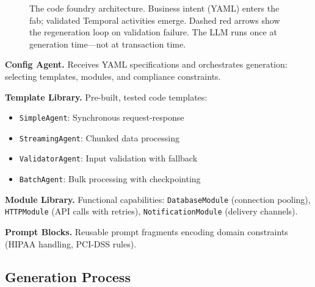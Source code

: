 \documentclass[11pt]{article}
\begin{document}
\begin{figure}[ht]
{
}%
\caption{The code foundry architecture. Business intent (YAML) enters the fab; validated Temporal activities emerge. Dashed red arrows show the regeneration loop on validation failure. The LLM runs once at generation time---not at transaction time.}
\label{fig:architecture}
\end{figure}

\textbf{Config Agent.} Receives YAML specifications and orchestrates generation: selecting templates, modules, and compliance constraints.

\textbf{Template Library.} Pre-built, tested code templates:
\begin{itemize}
    \item \texttt{SimpleAgent}: Synchronous request-response
    \item \texttt{StreamingAgent}: Chunked data processing
    \item \texttt{ValidatorAgent}: Input validation with fallback
    \item \texttt{BatchAgent}: Bulk processing with checkpointing
\end{itemize}

\textbf{Module Library.} Functional capabilities: \texttt{DatabaseModule} (connection pooling), \texttt{HTTPModule} (API calls with retries), \texttt{NotificationModule} (delivery channels).

\textbf{Prompt Blocks.} Reusable prompt fragments encoding domain constraints (HIPAA handling, PCI-DSS rules).

\subsection{Generation Process}
\end{document}

